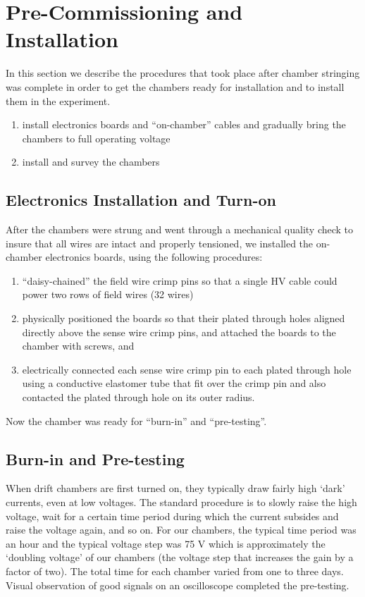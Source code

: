 \section{Pre-Commissioning and Installation}

In this section we describe the procedures that took
place after chamber stringing was complete in order to get the
chambers ready for installation and to install them 
in the experiment.

\begin{enumerate}
\item install electronics boards and ``on-chamber'' cables
and gradually bring the chambers to full operating voltage 
\item install and survey the chambers
\end{enumerate}

\subsection{Electronics Installation and Turn-on}
After the chambers were strung and went through a mechanical quality
check to insure that all wires are intact and properly tensioned, we
installed the on-chamber electronics boards, using
the following procedures:
\begin{enumerate}
\item ``daisy-chained'' the field wire crimp pins so that a single
HV cable could power two rows of field wires (32 wires)
\item physically positioned the boards so that their plated through
holes aligned directly above the sense wire crimp pins, and attached
the boards to the chamber with screws, and
\item electrically connected each sense wire crimp pin to each
plated through hole using a conductive elastomer tube that fit
over the crimp pin and also contacted the plated through hole on
its outer radius.
\end{enumerate}

Now the chamber was ready for ``burn-in'' and ``pre-testing''.

\subsection{Burn-in and Pre-testing}
When drift chambers are first turned on, they typically draw fairly high
`dark' currents, even at low voltages.  The standard procedure is to
slowly raise the high voltage, wait for a certain time period during
which the current subsides and raise the voltage again, and so on.
For our chambers, the typical time period was an hour and the typical
voltage step was 75 V which is approximately the `doubling voltage' of
our chambers (the voltage step that increases the gain by a factor
of two).  The total time for each chamber varied from one to three days.
Visual observation of good signals on an oscilloscope completed
the pre-testing.

